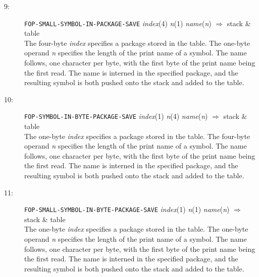 \begin{description}
\item[9:] \hspace{2em} {\tt FOP-SMALL-SYMBOL-IN-PACKAGE-SAVE}  \hspace{2em} {\it index}(4)
\hspace{2em} {\it n}(1) \hspace{2em} {\it name}({\it n}) \hspace{2em}
$\Rightarrow$ \hspace{2em} stack \& table\\
The four-byte {\it index} specifies a package stored in the table.
The one-byte operand {\it n} specifies the length of the print name
of a symbol.  The name follows, one character per byte,
with the first byte of the print name being the first read.
The name is interned in the specified package,
and the resulting symbol is both pushed onto the stack and added to the table.

\item[10:] \hspace{2em} {\tt FOP-SYMBOL-IN-BYTE-PACKAGE-SAVE} \hspace{2em} {\it index}(1)
\hspace{2em} {\it n}(4) \hspace{2em} {\it name}({\it n})
\hspace{2em} $\Rightarrow$ \hspace{2em} stack \& table\\
The one-byte {\it index} specifies a package stored in the table.
The four-byte operand {\it n} specifies the length of the print name
of a symbol.  The name follows, one character per byte,
with the first byte of the print name being the first read.
The name is interned in the specified package,
and the resulting symbol is both pushed onto the stack and added to the table.

\item[11:]\hspace{2em} {\tt FOP-SMALL-SYMBOL-IN-BYTE-PACKAGE-SAVE} \hspace{2em} {\it index}(1)
\hspace{2em} {\it n}(1) \hspace{2em} {\it name}({\it n}) \hspace{2em}
$\Rightarrow$ \hspace{2em} stack \& table\\
The one-byte {\it index} specifies a package stored in the table.
The one-byte operand {\it n} specifies the length of the print name
of a symbol.  The name follows, one character per byte,
with the first byte of the print name being the first read.
The name is interned in the specified package,
and the resulting symbol is both pushed onto the stack and added to the table.


\end{description}
